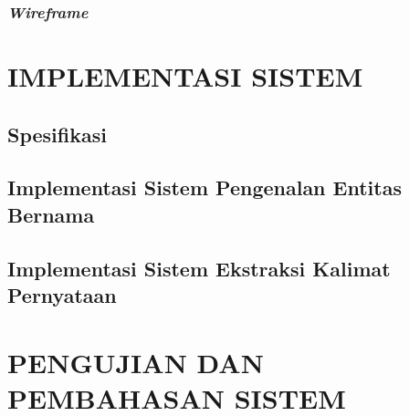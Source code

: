 \documentclass[ugmtesis]{ugmtesis}
\begin{document}
		\subsection{\textit{Wireframe}}
	    \label{rancangan wireframe antarmuka}
	    



\chapter{IMPLEMENTASI SISTEM}
\label{IMPLEMENTASI SISTEM}

	\section{Spesifikasi}
	\label{implementasi spesifikasi}
	

	\section{Implementasi Sistem Pengenalan Entitas Bernama}
	\label{implementasi sistem ner}
	

	\section{Implementasi Sistem Ekstraksi Kalimat Pernyataan}
	\label{implementasi sistem ekstraksi kalimat pernyataan}
	




\chapter{PENGUJIAN DAN PEMBAHASAN SISTEM}
\label{PENGUJIAN DAN PEMBAHASAN SISTEM}

\end{document}
